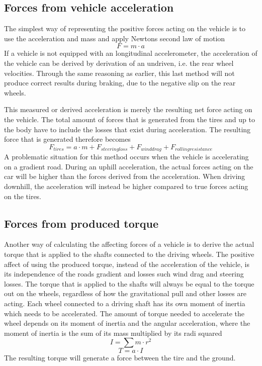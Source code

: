\subsection{Forces from vehicle acceleration}

The simplest way of representing the positive forces acting on the vehicle is to use the acceleration and mass and apply Newtons second law of motion
\begin{equation}
	F = m \cdot a
\end{equation}
If a vehicle is not equipped with an longitudinal accelerometer, the acceleration of the vehicle can be derived by derivation of an undriven, i.e. the rear wheel velocities. Through the same reasoning as earlier, this last method will not produce correct results during braking, due to the negative slip on the rear wheels. 

This measured or derived acceleration is merely the resulting net force acting on the vehicle. The total amount of forces that is generated from the tires and up to the body have to include the losses that exist during acceleration. The resulting force that is generated therefore becomes 
\begin{equation}
F_{tires} = a \cdot m + F_{steering loss} + F_{wind drag} + F_{rolling resistance}
\end{equation}
A problematic situation for this method occurs when the vehicle is accelerating on a gradient road. During an uphill acceleration, the actual forces acting on the car will be higher than the forces derived from the acceleration. When driving downhill, the acceleration will instead be  higher compared to true forces acting on the tires. 

\subsection{Forces from produced torque}

Another way of calculating the affecting forces of a vehicle is to derive the actual torque that is applied to the shafts connected to the driving wheels. The positive affect of using the produced torque, instead of the acceleration of the vehicle, is its independence of the roads gradient and losses such wind drag and steering losses. The torque that is applied to the shafts will always be equal to the torque out on the wheels, regardless of how the gravitational pull and other losses are acting. Each wheel connected to a driving shaft has its own moment of inertia which needs to be accelerated. The amount of torque needed to accelerate the wheel depends on its moment of inertia and the angular acceleration, where the moment of inertia is the sum of its mass multiplied by its radi squared
\begin{equation}
I = \sum m \cdot r^2
\end{equation}
\begin{equation}
	T = a \cdot I
\end{equation}
The resulting torque will generate a force between the tire and the ground.

